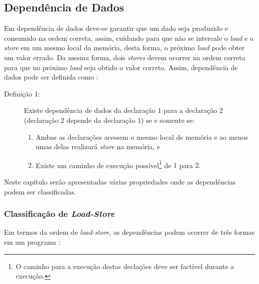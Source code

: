 \subsection{Dependência de Dados}

Em dependência de dados deve-se garantir que um dado seja produzido e consumido
na ordem correta, assim, cuidando para que não se intercale o \textit{load} e o
\textit{store} em um mesmo local da memória, desta forma, o próximo
\textit{load} pode obter um valor errado. 
Da mesma forma, dois \textit{stores} devem ocorrer na ordem correta para 
que no próximo \textit{load} seja obtido o valor correto.
Assim, dependência de dados pode ser definida como \cite[2.2]{ocfma}:

\begin{description}
        \item [Definição 1:] Existe dependência de dados da declaração $1$ para a declaração 
        $2$ (declaração $2$ depende da declaração $1$) se e somente se:
\begin{enumerate}
        \item Ambas as declarações acessem o mesmo local de memória e ao menos
                umas delas realizará \textit{store} na memória, e
        \item Existe um caminho de execução possível\footnote{O caminho para a
                        execução destas declações deve ser factível durante a 
                execução.} de $1$ para $2$.
\end{enumerate}
\end{description}

Neste capítulo serão apresentadas várias propriedades onde as dependências 
podem ser classificadas.


\subsubsection{Classificação de \textit{Load-Store}}

Em termos da ordem de \textit{load-store}, as dependências podem ocorrer de 
três formas em um programa \cite{Chang:2004}:

